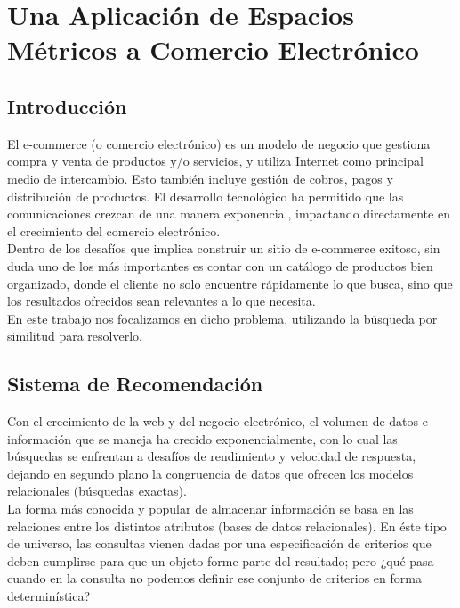 \chapter{Una Aplicaci\'on de Espacios M\'etricos a Comercio Electr\'onico}

\section{Introducci\'on}

El e-commerce (o comercio electr\'onico) es un modelo de negocio que gestiona compra y venta de productos y/o servicios, y utiliza Internet como principal medio de intercambio. Esto tambi\'en incluye gesti\'on de cobros, pagos y distribuci\'on de productos. El desarrollo tecnol\'ogico ha permitido que las comunicaciones crezcan de una manera exponencial, impactando directamente en el crecimiento del comercio electr\'onico.\\

Dentro de los desaf\'ios que implica construir un sitio de e-commerce exitoso, sin duda uno de los m\'as importantes es contar con un cat\'alogo de productos bien organizado, donde el cliente no solo encuentre r\'apidamente lo que busca, sino que los resultados ofrecidos sean relevantes a lo que necesita.\\

En este trabajo nos focalizamos en dicho problema, utilizando la b\'usqueda por similitud para resolverlo.\\

\section{Sistema de Recomendaci\'on}

Con el crecimiento de la web y del negocio electr\'onico, el volumen de datos e informaci\'on que se maneja ha crecido exponencialmente, con lo cual las b\'usquedas se enfrentan a desaf\'ios de rendimiento y velocidad de respuesta, dejando en segundo plano la congruencia de datos que ofrecen los modelos relacionales (b\'usquedas exactas).\\

La forma m\'as conocida y popular de almacenar informaci\'on se basa en las relaciones entre los distintos atributos (bases de datos relacionales). En \'este tipo de universo, las consultas vienen dadas por una especificaci\'on de criterios que deben cumplirse para que un objeto forme parte del resultado; pero ¿qu\'e pasa cuando en la consulta no podemos definir ese conjunto de criterios en forma determin\'istica?\\


